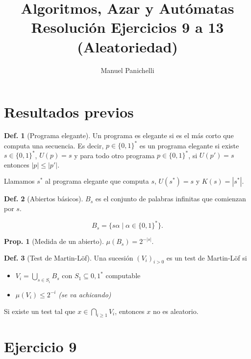 \documentclass{article}
\author{Manuel Panichelli}
\title{Algoritmos, Azar y Autómatas\\Resolución Ejercicios 9 a 13 (Aleatoriedad)}
\theoremstyle{definition} %
\newtheorem{proposition}{Prop.}
\newtheorem{definition}{Def.}
\newcommand{\measure}[1]{\mu\left(#1\right)}
\newcommand{\sucML}{(V_i)_{i > 0}}
\newcommand{\ZOalphabet}{\{0, 1\}^*}
\begin{document}
\maketitle

\section*{Resultados previos}

\begin{definition}[Programa elegante]\label{def:prog-elegante}
    Un programa es elegante si es el más corto que computa una secuencia. Es
    decir, $p \in \ZOalphabet$ es un programa elegante si existe $s \in
    \ZOalphabet$, $U(p) = s$ y para todo otro programa $p \in \ZOalphabet$, si
    $U(p') = s$ entonces $|p| \leq |p'|$.

    Llamamos $s^*$ al programa elegante que computa $s$, $U(s^*) = s$ y $K(s) = |s^*|$.
\end{definition}

\begin{definition}[Abiertos básicos]
    $B_s$ es el conjunto de palabras infinitas que comienzan por $s$.

    \[B_s = \{ s \alpha \mid \alpha \in \{0, 1\}^* \}.\]

\begin{proposition}[Medida de un abierto]
    $\measure{B_s} = 2^{-|s|}.$
\end{proposition}
\end{definition}

\begin{definition}[Test de Martin-Löf]\label{def:martin-lof}
    Una sucesión $\sucML$ es un test de Martin-Löf si

    \begin{itemize}
        \item $V_i = \bigcup_{s \in S_i} B_s$ con $S_1 \subseteq {0, 1}^*$
        computable
        \item $\measure{V_i} \leq 2^{-i}$ \textit{(se va achicando)}
    \end{itemize}

    Si existe un test tal que $x \in \bigcap_{i \geq 1} V_i$, entonces $x$ no es
    aleatorio.
\end{definition}

\newpage

\section*{Ejercicio 9}
\end{document}

